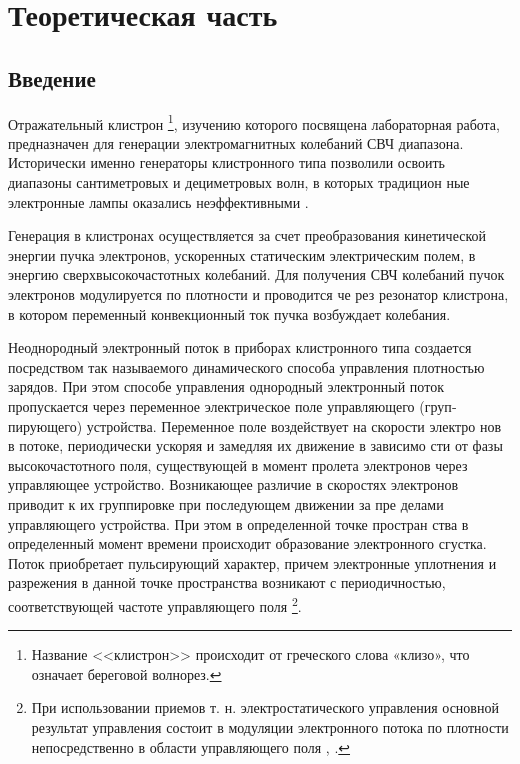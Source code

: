 
\usepackage{gensymb}
\usepackage{textcomp}
\usepackage{pythontex}


\def\labauthors{Карусевич А.А, Понур К.А.}
\def\labgroup{430}
\def\department{Кафедра электродинамики}
\def\labnumber{1}
\def\labtheme{Исследование отражательного клистрона}

\renewcommand{\Re}{\operatorname{Re}}
\renewcommand{\Im}{\operatorname{Im}}
\renewcommand{\phi}{\varphi}
\renewcommand{\hat}{\widehat}


\tableofcontents

\section{Теоретическая часть}

\subsection*{Введение}

Отражательный клистрон
\footnote{Название <<клистрон>> происходит от греческого слова «клизо», что означает береговой волнорез.}, 
изучению которого посвящена лабораторная
работа, предназначен для генерации электромагнитных колебаний СВЧ диа­пазона. Исторически именно генераторы клистронного типа позволили осво­ить диапазоны сантиметровых и дециметровых волн, в которых традицион­
ные электронные лампы оказались неэффективными \cite{litlink1}.

Генерация в клистронах осуществляется за счет преобразования кинети­ческой энергии пучка электронов, ускоренных статическим электрическим
полем, в энергию сверхвысокочастотных колебаний. Для получения СВЧ
колебаний пучок электронов модулируется по плотности и проводится че­
рез резонатор клистрона, в котором переменный конвекционный ток пучка
возбуждает колебания.

Неоднородный электронный поток в приборах клистронного типа созда­ется посредством так называемого динамического способа управления плот­ностью зарядов. При этом способе управления однородный электронный по­ток пропускается через переменное электрическое поле управляющего 
(груп­пирующего) устройства. Переменное поле воздействует на скорости электро­
нов в потоке, периодически ускоряя и замедляя их движение в зависимо­
сти от фазы высокочастотного поля, существующей в момент пролета элек­тронов через управляющее устройство. Возникающее различие в скоростях
электронов приводит к их группировке при последующем движении за пре­
делами управляющего устройства. При этом в определенной точке простран­
ства в определенный момент времени происходит образование электронного
сгустка. Поток приобретает пульсирующий характер, причем электронные
уплотнения и разрежения в данной точке пространства возникают с перио­дичностью, соответствующей частоте управляющего поля
\footnote{При использовании приемов т. н. электростатического управления основной результат управ­ления состоит в модуляции электронного потока по плотности непосредственно в области управ­ляющего поля \cite{litlink3}, \cite{litlink2}.}.

